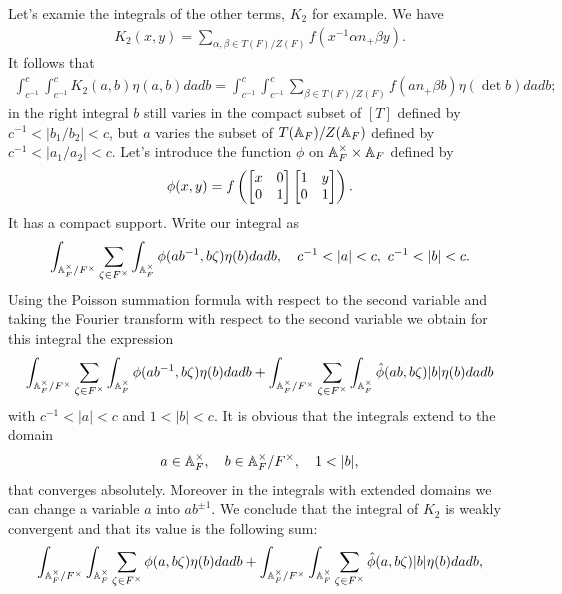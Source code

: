 Let's examie the integrals of the other terms, $K_2$ for example.
We have
\begin{align}
    K_2(x, y) = \sum_{\alpha, \beta \in T(F) / Z(F)} f(x^{-1} \alpha n_+ \beta y).
\end{align}
It follows that
\begin{align*}
    \int_{c^{-1}}^{c} \int_{c^{-1}}^{c} K_2(a, b) \eta(a, b) da db = \int_{c^{-1}}^{c} \int_{c^{-1}}^{c} \sum_{\beta \in T(F)/Z(F)} f(a n_+ \beta b) \eta (\det b) da db;
\end{align*}
in the right integral $b$ still varies in the compact subset of $[T]$ defined by $c^{-1} < |b_1 / b_2| <c$, but $a$ varies the subset of $T(\mathbb{A}_F) / Z(\mathbb{A}_F)$ defined by $c^{-1} < |a_1 / a_2| < c$.
Let's introduce the function $\phi$ on $\mathbb{A}_F^\times \times \mathbb{A}_F$ defined by
\begin{align}
    \phi(x, y) = f\left(\begin{bmatrix} x & 0 \\ 0 & 1 \end{bmatrix} \begin{bmatrix} 1 & y \\ 0 & 1 \end{bmatrix}\right).
\end{align}
It has a compact support. 
{\color{red}
Write our integral as
\begin{align*}
    \int_{\mathbb{A}_F^\times / F^\times} \sum_{\zeta \in F^\times} \int_{\mathbb{A}_F^\times} \phi(ab^{-1}, b\zeta) \eta(b) da db, \quad c^{-1} < |a| < c, \,\, c^{-1} < |b| < c.
\end{align*}
}
Using the Poisson summation formula with respect to the second variable and taking the Fourier transform with respect to the second variable we obtain for this integral the expression
\begin{align*}
    \int_{\mathbb{A}_F^\times / F^\times} \sum_{\zeta \in F^\times} \int_{\mathbb{A}_F^\times} \phi(ab^{-1}, b\zeta) \eta(b)dadb + \int_{\mathbb{A}_F^\times /F^\times} \sum_{\zeta \in F^\times} \int_{\mathbb{A}_F^\times} \hat{\phi} (ab, b\zeta) |b| \eta(b) dadb
\end{align*}
with $c^{-1} < |a| < c$ and $1 < |b| < c$.
It is obvious that the integrals extend to the domain
\begin{align*}
    a\in\mathbb{A}_F^\times, \quad b\in \mathbb{A}_F^\times / F^\times, \quad 1 < |b|,
\end{align*}
that converges absolutely.
Moreover in the integrals with extended domains we can change a variable $a$ into $ab^{\pm 1}$.
We conclude that the integral of $K_2$ is weakly convergent and that its value is the following sum:
\begin{align*}
    \int_{\mathbb{A}_F^\times / F^\times}\int_{\mathbb{A}_F^\times} \sum_{\zeta \in F^\times} \phi(a, b\zeta) \eta(b) da db + \int_{\mathbb{A}_F^\times /F^\times} \int_{\mathbb{A}_F^\times} \sum_{\zeta \in F^\times} \hat{\phi}(a, b\zeta) |b| \eta(b) da db,
\end{align*}

